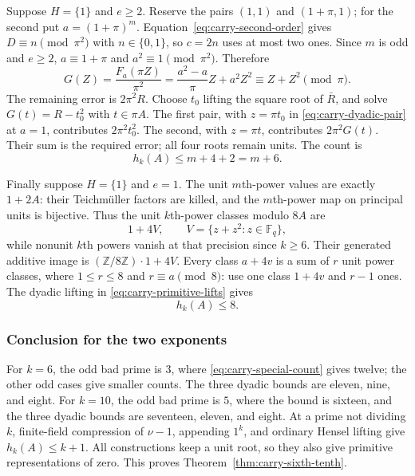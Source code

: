\documentclass[11pt]{amsart}
\theoremstyle{definition}
\numberwithin{equation}{section}
\begin{document}
Suppose $H=\{1\}$ and $e\ge2$. Reserve the pairs $(1,1)$ and
$(1+\pi,1)$; for the second put $a=(1+\pi)^m$.
Equation~\eqref{eq:carry-second-order} gives
$D\equiv n\pmod{\pi^2}$ with $n\in\{0,1\}$, so $c=2n$
uses at most two ones. Since $m$ is odd and $e\ge2$,
$a\equiv1+\pi$ and $a^2\equiv1\pmod{\pi^2}$. Therefore
\[
 G(Z)=\frac{F_a(\pi Z)}{\pi^2}
     =\frac{a^2-a}{\pi}Z+a^2Z^2\equiv Z+Z^2\pmod\pi.
\]
The remaining error is $2\pi^2R$. Choose $t_0$ lifting the square
root of $\bar R$, and solve $G(t)=R-t_0^2$ with $t\in\pi A$.
The first pair, with $z=\pi t_0$ in
\eqref{eq:carry-dyadic-pair} at $a=1$, contributes
$2\pi^2t_0^2$. The second, with $z=\pi t$, contributes
$2\pi^2G(t)$. Their sum is the required error; all four roots
remain units. The count is
\begin{equation}\label{eq:carry-dyadic-trivial-count}
 h_k(A)\le m+4+2=m+6.
\end{equation}

Finally suppose $H=\{1\}$ and $e=1$. The unit $m$th-power
values are exactly $1+2A$: their Teichm\"uller factors are killed,
and the $m$th-power map on principal units is bijective. Thus the
unit $k$th-power classes modulo $8A$ are
\[
 1+4V,\qquad V=\{z+z^2:z\in\mathbb F_q\},
\]
while nonunit $k$th powers vanish at that precision since $k\ge6$.
Their generated additive image is
$(\mathbb Z/8\mathbb Z)\cdot1+4V$. Every class $a+4v$ is a
sum of $r$ unit power classes, where $1\le r\le8$ and
$r\equiv a\pmod8$: use one class $1+4v$ and $r-1$ ones.
The dyadic lifting in \eqref{eq:carry-primitive-lifts} gives
\begin{equation}\label{eq:carry-dyadic-unramified-count}
 h_k(A)\le8.
\end{equation}

\subsubsection{Conclusion for the two exponents}

For $k=6$, the odd bad prime is $3$, where
\eqref{eq:carry-special-count} gives twelve; the other odd cases
give smaller counts. The three dyadic bounds are eleven, nine,
and eight. For $k=10$, the odd bad prime is $5$, where the bound
is sixteen, and the three dyadic bounds are seventeen, eleven,
and eight. At a prime not dividing $k$, finite-field compression
of $\nu-1$, appending $1^k$, and ordinary Hensel lifting give
$h_k(A)\le k+1$. All constructions keep a unit root, so they also
give primitive representations of zero. This proves
Theorem~\ref{thm:carry-sixth-tenth}.
\end{document}

